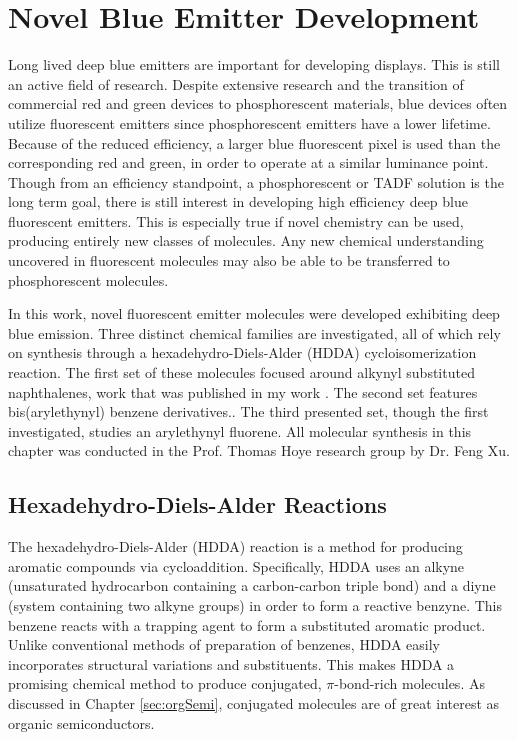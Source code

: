 \documentclass[../thesis.tex]{subfiles}
\begin{document}
\chapter{Novel Blue Emitter Development}\label{sec:hoye}

Long lived deep blue emitters are important for developing displays.
This is still an active field of research.\supercite{Chan2018,Tang2018}
Despite extensive research and the transition of commercial red and green devices to phosphorescent materials, blue devices often utilize fluorescent emitters since phosphorescent emitters have a lower lifetime.\supercite{Scholz2015}
Because of the reduced efficiency, a larger blue fluorescent pixel is used than the corresponding red and green, in order to operate at a similar luminance point.
Though from an efficiency standpoint, a phosphorescent or TADF solution is the long term goal, there is still interest in developing high efficiency deep blue fluorescent emitters.\supercite{Lee2009b,Chi2010,Kim2008,Zhu2013,Lee2005}
This is especially true if novel chemistry can be used, producing entirely new classes of molecules.
Any new chemical understanding uncovered in fluorescent molecules may also be able to be transferred to phosphorescent molecules.

In this work, novel fluorescent emitter molecules were developed exhibiting deep blue emission.
Three distinct chemical families are investigated, all of which rely on synthesis through a hexadehydro-Diels-Alder (HDDA) cycloisomerization reaction.
The first set of these molecules focused around alkynyl substituted naphthalenes, work that was published in my work \textcite{Xu2016}.
The second set features  bis(arylethynyl) benzene derivatives..
The third presented set, though the first investigated, studies an arylethynyl fluorene.
All molecular synthesis in this chapter was conducted in the Prof. Thomas Hoye research group by Dr. Feng Xu.

\section{Hexadehydro-Diels-Alder Reactions}

The hexadehydro-Diels-Alder (HDDA) reaction is a method for producing aromatic compounds via cycloaddition.
Specifically, HDDA uses an alkyne (unsaturated hydrocarbon containing a carbon-carbon triple bond) and a diyne (system containing two alkyne groups) in order to form a reactive benzyne.
This benzene reacts with a trapping agent to form a substituted aromatic product.\supercite{Hoye2012,Yeoman2012}
Unlike conventional methods of preparation of benzenes, HDDA easily incorporates structural variations and substituents. \supercite{Bradley1997,Baire2013,Tadross2012} 
This makes HDDA a promising chemical method to produce conjugated, $\pi$-bond-rich molecules.
As discussed in Chapter \ref{sec:orgSemi}, conjugated molecules are of great interest as organic semiconductors.
\end{document}
